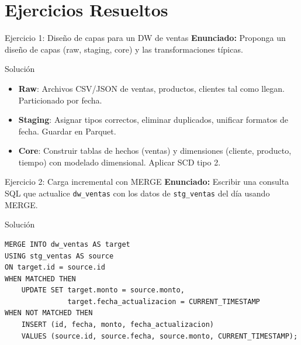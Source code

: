 \documentclass[aspectratio=169, 10pt, xcolor=table]{beamer}
\begin{document}
\section{Ejercicios Resueltos}

\begin{frame}{Ejercicio 1: Diseño de capas para un DW de ventas}
    \textbf{Enunciado:} Proponga un diseño de capas (raw, staging, core) y las transformaciones típicas.
    \begin{block}{Solución}
        \begin{itemize}
            \item \textbf{Raw}: Archivos CSV/JSON de ventas, productos, clientes tal como llegan. Particionado por fecha.
            \item \textbf{Staging}: Asignar tipos correctos, eliminar duplicados, unificar formatos de fecha. Guardar en Parquet.
            \item \textbf{Core}: Construir tablas de hechos (ventas) y dimensiones (cliente, producto, tiempo) con modelado dimensional. Aplicar SCD tipo 2.
        \end{itemize}
    \end{block}
\end{frame}

\begin{frame}[fragile]{Ejercicio 2: Carga incremental con MERGE}
    \textbf{Enunciado:} Escribir una consulta SQL que actualice \texttt{dw\_ventas} con los datos de \texttt{stg\_ventas} del día usando MERGE.
    \begin{block}{Solución}
        \begin{lstlisting}
MERGE INTO dw_ventas AS target
USING stg_ventas AS source
ON target.id = source.id
WHEN MATCHED THEN
    UPDATE SET target.monto = source.monto,
               target.fecha_actualizacion = CURRENT_TIMESTAMP
WHEN NOT MATCHED THEN
    INSERT (id, fecha, monto, fecha_actualizacion)
    VALUES (source.id, source.fecha, source.monto, CURRENT_TIMESTAMP);
        \end{lstlisting}
    \end{block}
\end{frame}
\end{document}
